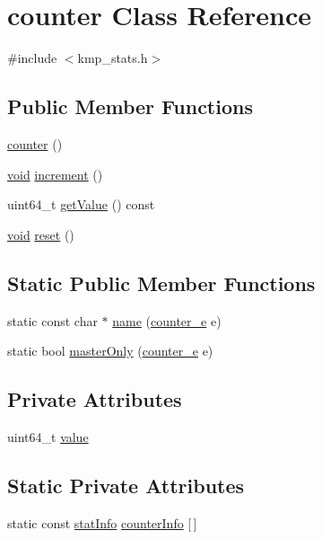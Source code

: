 \hypertarget{classcounter}{\section{counter Class Reference}
\label{classcounter}
}


{\ttfamily \#include $<$kmp\-\_\-stats.\-h$>$}

\subsection*{Public Member Functions}
\begin{DoxyCompactItemize}
\item 
\hyperlink{classcounter_aaf68422e2ecf60e236b21bc407d43f05}{counter} ()
\item 
\hyperlink{ittnotify__static_8h_af941d56e55e3c5465135b60c4d6343ed}{void} \hyperlink{classcounter_a869c4acb9046b43421790d994a374d7e}{increment} ()
\item 
uint64\-\_\-t \hyperlink{classcounter_ac90fe351c0596fcddf14ffb3e8742fa1}{get\-Value} () const 
\item 
\hyperlink{ittnotify__static_8h_af941d56e55e3c5465135b60c4d6343ed}{void} \hyperlink{classcounter_a93af6caf9e9fc2a6d235ca16f5fab6b7}{reset} ()
\end{DoxyCompactItemize}
\subsection*{Static Public Member Functions}
\begin{DoxyCompactItemize}
\item 
static const char $\ast$ \hyperlink{classcounter_a47381a4ed766e73be894b74078391a05}{name} (\hyperlink{kmp__stats_8h_a369a3f9687663102f214798ed3915336}{counter\-\_\-e} e)
\item 
static bool \hyperlink{classcounter_ab69639dd9dbdfbb04fc594e431beda1c}{master\-Only} (\hyperlink{kmp__stats_8h_a369a3f9687663102f214798ed3915336}{counter\-\_\-e} e)
\end{DoxyCompactItemize}
\subsection*{Private Attributes}
\begin{DoxyCompactItemize}
\item 
uint64\-\_\-t \hyperlink{classcounter_a86ec46cd3be151acee603a8cd9c93a4e}{value}
\end{DoxyCompactItemize}
\subsection*{Static Private Attributes}
\begin{DoxyCompactItemize}
\item 
static const \hyperlink{structstatInfo}{stat\-Info} \hyperlink{classcounter_ad82a016108023b47028bb79151ab960f}{counter\-Info} \mbox{[}$\,$\mbox{]}
\end{DoxyCompactItemize}


